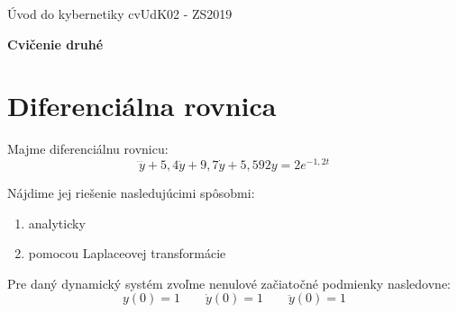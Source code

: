\documentclass[a4paper, 10pt, ]{article}
\def\oznacenieCasti{cvUdK02 - ZS2019}
\begin{document}
\lstset{style=mystyle}





\fontsize{12pt}{22pt}\selectfont

\centerline{\textsf{Úvod do kybernetiky} \hfill \textsf{\oznacenieCasti}}

\fontsize{18pt}{22pt}\selectfont





\begin{flushleft}
    \textbf{\textsf{Cvičenie druhé}}
\end{flushleft}





\normalsize

\bigskip

\tableofcontents

\bigskip

\vspace{18pt}




\section{Diferenciálna rovnica}

\noindent
Majme diferenciálnu rovnicu:
\begin{equation} \label{Zadaná rovnica}
	\dddot{y} + 5,4 \ddot{y} + 9,7 \dot{y} + 5,592 y = 2 e^{-1,2t}
\end{equation}

\noindent
Nájdime jej riešenie nasledujúcimi spôsobmi:
\begin{enumerate}
	\item analyticky
    \item pomocou Laplaceovej transformácie
\end{enumerate}

\noindent
Pre daný dynamický systém zvoľme nenulové začiatočné podmienky nasledovne:
\begin{equation*}
		y(0) = 1 \qquad \dot{y}(0)  = 1 \qquad 	\ddot{y}(0) = 1
\end{equation*}
\end{document}

